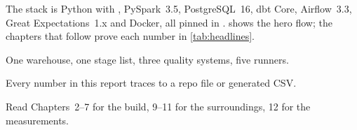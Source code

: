 The stack is Python with , PySpark~3.5, PostgreSQL~16, dbt Core, Airflow~3.3, Great Expectations~1.x and Docker, all pinned in .  shows the hero flow; the chapters that follow prove each number in \cref{tab:headlines}.

\begin{keybox}
\item One warehouse, one stage list, three quality systems, five runners.
\item Every number in this report traces to a repo file or generated CSV.
\item Read Chapters~2--7 for the build, 9--11 for the surroundings, 12 for the measurements.
\end{keybox}
